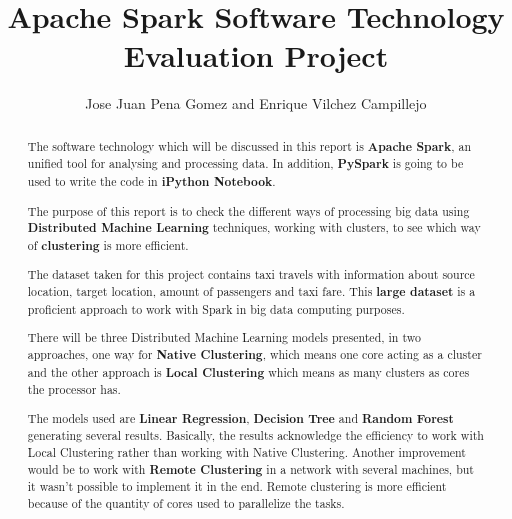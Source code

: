 \documentclass[11pt]{article}
\begin{document}
\title{Apache Spark Software Technology Evaluation Project}

\author{Jose Juan Pena Gomez and Enrique Vilchez Campillejo}

\maketitle

\begin{abstract}

The software technology which will be discussed in this report is \textbf{Apache Spark}, an unified tool for analysing and processing data. In addition, \textbf{PySpark} is going to be used to write the code in \textbf{iPython Notebook}.

The purpose of this report is to check the different ways of processing big data using \textbf{Distributed Machine Learning} techniques, working with clusters, to see which way of \textbf{clustering} is more efficient.

The dataset taken for this project contains taxi travels with information about source location, target location, amount of passengers and taxi fare. This \textbf{large dataset} is a proficient approach to work with Spark in big data computing purposes.

There will be three Distributed Machine Learning models presented, in two approaches, one way for \textbf{Native Clustering}, which means one core acting as a cluster and the other approach is \textbf{Local Clustering} which means as many clusters as cores the processor has.

The models used are \textbf{Linear Regression}, \textbf{Decision Tree} and \textbf{Random Forest} generating several results. Basically, the results acknowledge the efficiency to work with Local Clustering rather than working with Native Clustering.  Another improvement would be to work with \textbf{Remote Clustering} in a network with several machines, but it wasn't possible to implement it in the end. Remote clustering is more efficient because of the quantity of cores used to parallelize the tasks.

  
\end{abstract}

%












{}
\end{document}
